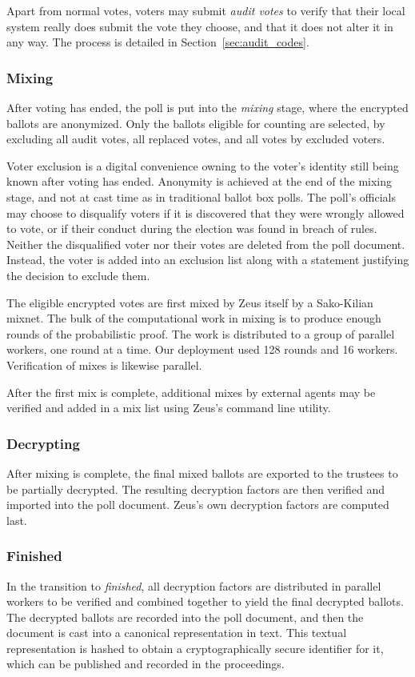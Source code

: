 \documentclass[letterpaper,10pt]{article}
\begin{document}
Apart from normal votes, voters may submit \emph{audit votes} to verify
that their local system really does submit the vote they choose,
and that it does not alter it in any way.
The process is detailed in Section~\ref{sec:audit_codes}.

\subsubsection{Mixing}
\label{sec:mixing}
After voting has ended, the poll is put into the \emph{mixing} stage,
where the encrypted ballots are anonymized.
Only the ballots eligible for counting are selected, by excluding
all audit votes, all replaced votes, and all votes by excluded voters.

Voter exclusion is a digital convenience owning to
the voter's identity still being known after voting has ended.
Anonymity is achieved at the end of the mixing stage,
and not at cast time as in traditional ballot box polls.
The poll's officials may choose to disqualify voters if
it is discovered that they were wrongly allowed to vote, or if
their conduct during the election was found in breach of rules.
Neither the disqualified voter nor their votes are deleted from 
the poll document. Instead, the voter is added into an exclusion 
list along with a statement justifying the decision to exclude them.

The eligible encrypted votes are first mixed by Zeus itself
by a Sako-Kilian mixnet.
The bulk of the computational work in mixing is to produce
enough rounds of the probabilistic proof.
The work is distributed to a group of parallel workers,
one round at a time. Our deployment used 128 rounds and 16 workers.
Verification of mixes is likewise parallel.

After the first mix is complete, additional mixes by external agents
may be verified and added in a mix list using Zeus's command line
utility. 

\subsubsection{Decrypting}
\label{sec:decrypting}

After mixing is complete, the final mixed ballots are exported to
the trustees to be partially decrypted.
The resulting decryption factors are then verified and imported
into the poll document.
Zeus's own decryption factors are computed last.

\subsubsection{Finished}
\label{sec:finished}
In the transition to \emph{finished}, all decryption factors are
distributed in parallel workers to be verified and combined together
to yield the final decrypted ballots.
The decrypted ballots are recorded into the poll document,
and then the document is cast into a canonical representation in text.
This textual representation is hashed to obtain a cryptographically
secure identifier for it, which can be published and recorded
in the proceedings.
\end{document}
